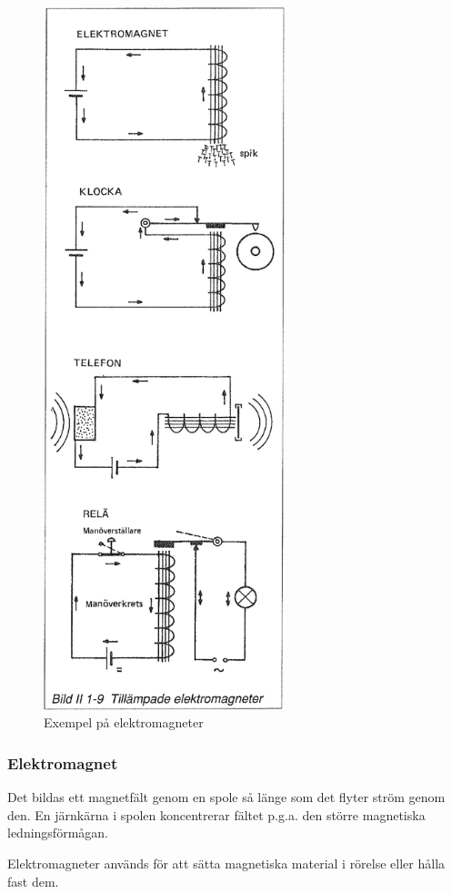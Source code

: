 \begin{figure}[h]
\begin{center}
\includegraphics[width=7cm]{images/bild_2_1-09}
\caption{Exempel på elektromagneter}
\label{fig:BildII1-9}
\end{center}
\end{figure}


\subsubsection{Elektromagnet}
Det bildas ett magnetfält genom en spole så länge som det flyter ström genom den. En
järnkärna i spolen koncentrerar fältet p.g.a. den större magnetiska ledningsförmågan.

Elektromagneter används för att sätta magnetiska material i rörelse eller hålla fast
dem.

